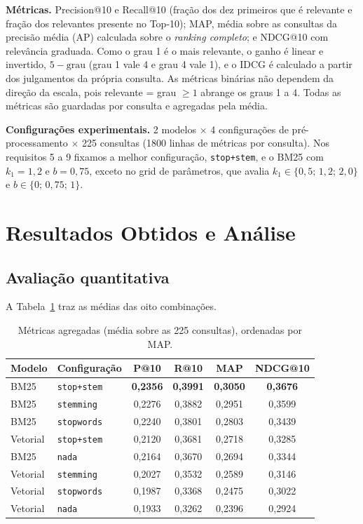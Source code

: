 \documentclass[10pt,a4paper]{article}
\begin{document}
\textbf{Métricas.} Precision@10 e Recall@10 (fração dos dez primeiros que é relevante e fração
dos relevantes presente no Top-10); MAP, média sobre as consultas da precisão média (AP) calculada
sobre o \emph{ranking completo}; e NDCG@10 com relevância graduada. Como o grau 1 é o mais
relevante, o ganho é linear e invertido, $5-\text{grau}$ (grau 1 vale 4 e grau 4 vale 1), e o IDCG é
calculado a partir dos julgamentos da própria consulta. As métricas binárias não dependem da
direção da escala, pois relevante = grau $\geq 1$ abrange os graus 1 a 4. Todas as métricas são
guardadas por consulta e agregadas pela média.

\textbf{Configurações experimentais.} 2 modelos $\times$ 4 configurações de pré-processamento
$\times$ 225 consultas (1800 linhas de métricas por consulta). Nos requisitos 5 a 9 fixamos a
melhor configuração, \texttt{stop+stem}, e o BM25 com $k_1=1{,}2$ e $b=0{,}75$, exceto no
grid de parâmetros, que avalia $k_1\in\{0{,}5;\,1{,}2;\,2{,}0\}$ e $b\in\{0;\,0{,}75;\,1\}$.

\section{Resultados Obtidos e Análise}
\subsection{Avaliação quantitativa}
A Tabela~\ref{tab:agregado} traz as médias das oito combinações.

\begin{table}[h]
\centering\small
\caption{Métricas agregadas (média sobre as 225 consultas), ordenadas por MAP.}
\label{tab:agregado}
\begin{tabular}{llcccc}
\toprule
Modelo & Configuração & P@10 & R@10 & MAP & NDCG@10 \\
\midrule
BM25     & \texttt{stop+stem} & \textbf{0,2356} & \textbf{0,3991} & \textbf{0,3050} & \textbf{0,3676} \\
BM25     & \texttt{stemming}  & 0,2276 & 0,3882 & 0,2951 & 0,3599 \\
BM25     & \texttt{stopwords} & 0,2240 & 0,3801 & 0,2803 & 0,3439 \\
Vetorial & \texttt{stop+stem} & 0,2120 & 0,3681 & 0,2718 & 0,3285 \\
BM25     & \texttt{nada}      & 0,2164 & 0,3670 & 0,2694 & 0,3344 \\
Vetorial & \texttt{stemming}  & 0,2027 & 0,3532 & 0,2589 & 0,3146 \\
Vetorial & \texttt{stopwords} & 0,1987 & 0,3368 & 0,2475 & 0,3022 \\
Vetorial & \texttt{nada}      & 0,1933 & 0,3262 & 0,2396 & 0,2924 \\
\bottomrule
\end{tabular}
\end{table}
\end{document}
